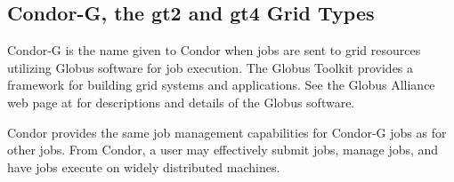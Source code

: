 
\subsection{\label{sec:Condor-G}Condor-G, the gt2 and gt4 Grid Types}

Condor-G is the name given to Condor when 
 jobs are sent to grid resources utilizing
Globus software for job execution.
The Globus Toolkit provides a framework for building grid systems
and applications.
See the Globus Alliance web page at
for descriptions and details of the Globus software.

Condor provides the same job management capabilities for Condor-G
jobs as for other jobs.
From Condor, a user may effectively submit jobs, manage jobs,
and have jobs execute on widely distributed machines.




